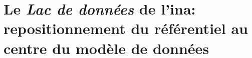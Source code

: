 \section{\label{III-B-2}Le \textit{Lac de données} de l'\ac{ina}: repositionnement du référentiel au centre du modèle de données}


